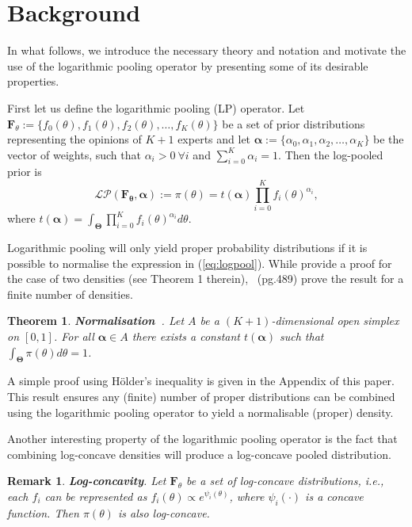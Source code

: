 \documentclass[a4paper, notitlepage, 10pt]{article}
\newtheorem{theo}{Theorem}[]
\newtheorem{remark}{Remark}[]
\begin{document}
\section{Background}
\label{sec:background}

In what follows, we introduce the necessary theory and notation and motivate the use of the logarithmic pooling operator by presenting some of its desirable properties.

First let us define the logarithmic pooling (LP) operator.
Let $\mathbf{F}_{\theta} := \{f_0(\theta), f_1(\theta), f_2(\theta), \ldots, f_K(\theta)\}$ be a set of prior distributions representing the opinions of $K+1$ experts and let $\boldsymbol\alpha :=\{\alpha_0, \alpha_1, \alpha_2, \ldots, \alpha_K \}$ be the vector of weights, such that $\alpha_i > 0\: \forall i$ and $\sum_{i=0}^K \alpha_i = 1$.
Then the log-pooled prior is
\begin{equation}
\label{eq:logpool}
 \mathcal{LP}(\mathbf{F_\theta}, \boldsymbol\alpha) := \pi(\theta) = t(\boldsymbol\alpha) \prod_{i=0}^K f_i(\theta)^{\alpha_i},
\end{equation}
where $t(\boldsymbol\alpha) = \int_{\boldsymbol\Theta}\prod_{i=0}^K f_i(\theta)^{\alpha_i}d\theta$.

Logarithmic pooling will only yield proper probability distributions if it is possible to normalise the expression in (\ref{eq:logpool}).
While \citet{poole2000} provide a proof for the case of two densities (see Theorem 1 therein),~\cite{genest1986A} (pg.489) prove the result for a finite number of densities.
\begin{theo}
\label{thm:normalisation}
\textbf{Normalisation~\citep{genest1986A}}. 
Let $A$ be a $(K+1)$-dimensional open simplex on $[0,1]$.
For all $\boldsymbol\alpha \in A$ there exists a constant $t(\boldsymbol\alpha)$ such that $\int_{\boldsymbol\Theta}\pi(\theta)d\theta = 1$.
\end{theo}
A simple proof using H\"{o}lder's inequality is given in the Appendix of this paper.
This result ensures any (finite) number of proper distributions can be combined using the logarithmic pooling operator to yield a normalisable (proper) density.

Another interesting property of the logarithmic pooling operator is the fact that combining log-concave densities will produce a log-concave pooled distribution.
\begin{remark}
\label{rmk:concavity}
\textbf{Log-concavity}. 
 Let $\mathbf{F}_{\theta}$ be a set of log-concave distributions, i.e., each $f_i$ can be represented as $ f_i(\theta) \propto e^{\psi_i(\theta)}$, where $\psi_i(\cdot)$ is a concave function.
Then $\pi(\theta)$ is also log-concave.
\end{remark}
\end{document}
